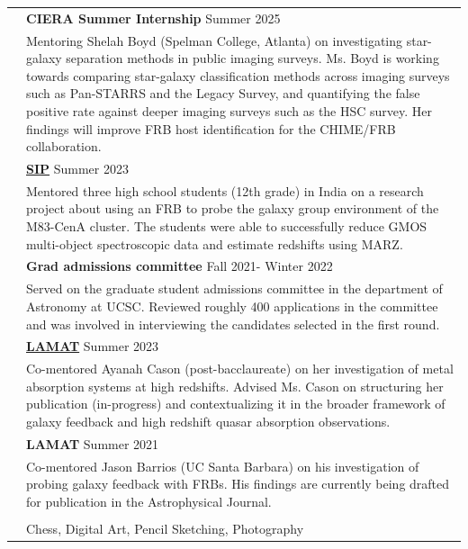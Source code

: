\documentclass[letterpaper, 11pt]{article}
\begin{document}
\begin{longtable}{p{1.3in}p{4.8in}}
\newpage
\color{OliveGreen}{Mentorship \&}
& \textbf{CIERA Summer Internship} \hfill Summer 2025\\
\color{OliveGreen}{service roles} & Mentoring Shelah Boyd (Spelman College, Atlanta) on investigating star-galaxy separation methods in public imaging surveys. Ms. Boyd is working towards comparing star-galaxy classification methods across imaging surveys such as Pan-STARRS and the Legacy Survey, and quantifying the false positive rate against deeper imaging surveys such as the HSC survey. Her findings will improve FRB host identification for the CHIME/FRB collaboration.\\
& \textbf{\href{https://sip.ucsc.edu/}{SIP}} \hfill Summer 2023\\
& Mentored three high school students (12th grade) in India on a research project about using an FRB to probe the galaxy group environment of the M83-CenA cluster. The students were able to successfully reduce GMOS multi-object spectroscopic data and estimate redshifts using MARZ.\\
& \textbf{Grad admissions committee} \hfill Fall 2021- Winter 2022 \\
 & Served on the graduate student admissions committee in the department of Astronomy at UCSC. Reviewed roughly 400 applications in the committee and was involved in interviewing the candidates selected in the first round.\\
& \textbf{\href{https://lamat.science.ucsc.edu/}{LAMAT}} \hfill Summer 2023 \\
 & Co-mentored Ayanah Cason (post-bacclaureate) on her investigation of metal absorption systems at high redshifts. Advised Ms. Cason on structuring her publication (in-progress) and contextualizing it in the broader framework of galaxy feedback and high redshift quasar absorption observations.\\
& \textbf{LAMAT} \hfill Summer 2021 \\
 & Co-mentored Jason Barrios (UC Santa Barbara) on his investigation of probing galaxy feedback with FRBs. His findings are currently being drafted for publication in the Astrophysical Journal.\\
 \hline
& \\




\nohyphens{\color{OliveGreen}{Hobbies}} & Chess, Digital Art, Pencil Sketching, Photography\\


\end{longtable}
\end{document}
